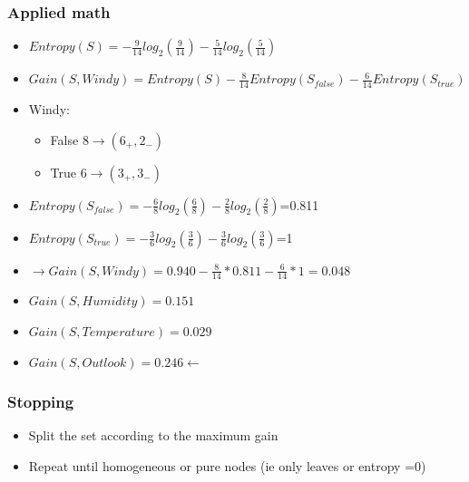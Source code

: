 \begin{frame}
\frametitle{Applied math}
\begin{itemize}
\item $Entropy(S)= -\frac{9}{14}log_2(\frac{9}{14})- \frac{5}{14}log_2(\frac{5}{14}) $
\item $Gain(S,Windy) =Entropy(S)-\frac{8}{14}Entropy(S_{false})-\frac{6}{14}Entropy(S_{true})$
\item Windy: 
\begin{itemize}
\item False $8\rightarrow(6_+,2_-)$
\item True $6\rightarrow (3_+,3_-)$
\end{itemize}
\item $Entropy(S_{false})=-\frac{6}{8}log_2(\frac{6}{8})-\frac{2}{8}log_2(\frac{2}{8})$=0.811
\item $Entropy(S_{true})=-\frac{3}{6}log_2(\frac{3}{6})-\frac{3}{6}log_2(\frac{3}{6})$=1
\item $\rightarrow Gain(S,Windy)=0.940-\frac{8}{14}*0.811-\frac{6}{14}*1=0.048$
\item $Gain(S,Humidity)=0.151$ 
\item $Gain(S,Temperature)=0.029$ 
\item $Gain(S,Outlook)=0.246   \leftarrow$ 
\end{itemize}
\end{frame}


\begin{frame}
\frametitle{Stopping}
\begin{itemize}
\item Split the set according to the maximum gain
\item Repeat until homogeneous or pure nodes (ie only leaves or entropy =0)
\end{itemize}
\end{frame}

